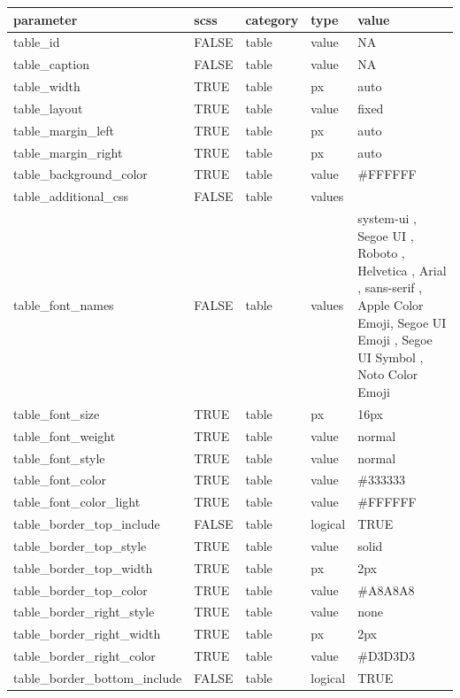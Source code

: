 \documentclass[
  letterpaper,
  DIV=11,
  numbers=noendperiod]{scrartcl}
\begin{document}
\begin{table}
{\begin{table}
\end{table}
\centering
\begin{tabular}[t]{l|l|l|l|l}
\hline
parameter & scss & category & type & value\\
\hline
table\_id & FALSE & table & value & NA\\
\hline
table\_caption & FALSE & table & value & NA\\
\hline
table\_width & TRUE & table & px & auto\\
\hline
table\_layout & TRUE & table & value & fixed\\
\hline
table\_margin\_left & TRUE & table & px & auto\\
\hline
table\_margin\_right & TRUE & table & px & auto\\
\hline
table\_background\_color & TRUE & table & value & \#FFFFFF\\
\hline
table\_additional\_css & FALSE & table & values & \\
\hline
table\_font\_names & FALSE & table & values & system-ui        , Segoe UI         , Roboto           , Helvetica        , Arial            , sans-serif       , Apple Color Emoji, Segoe UI Emoji   , Segoe UI Symbol  , Noto Color Emoji\\
\hline
table\_font\_size & TRUE & table & px & 16px\\
\hline
table\_font\_weight & TRUE & table & value & normal\\
\hline
table\_font\_style & TRUE & table & value & normal\\
\hline
table\_font\_color & TRUE & table & value & \#333333\\
\hline
table\_font\_color\_light & TRUE & table & value & \#FFFFFF\\
\hline
table\_border\_top\_include & FALSE & table & logical & TRUE\\
\hline
table\_border\_top\_style & TRUE & table & value & solid\\
\hline
table\_border\_top\_width & TRUE & table & px & 2px\\
\hline
table\_border\_top\_color & TRUE & table & value & \#A8A8A8\\
\hline
table\_border\_right\_style & TRUE & table & value & none\\
\hline
table\_border\_right\_width & TRUE & table & px & 2px\\
\hline
table\_border\_right\_color & TRUE & table & value & \#D3D3D3\\
\hline
table\_border\_bottom\_include & FALSE & table & logical & TRUE\\

\end{tabular}}
\end{table}
\end{document}
